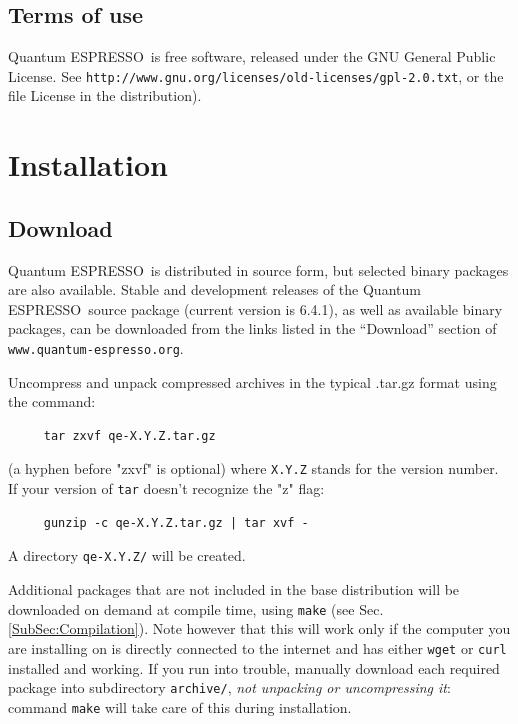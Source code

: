 \documentclass[12pt,a4paper]{article}
\def\version{6.4}
\def\version{6.4.1}
\def\qe{{\sc Quantum ESPRESSO}}
\begin{document}
\subsection{Terms of use}
\label{SubSec:Terms}

\qe\ is free software, released under the
GNU General Public License. See
\texttt{http://www.gnu.org/licenses/old-licenses/gpl-2.0.txt},
or the file License in the distribution).


\section{Installation}

\subsection{Download}
\label{SubSec:Download}

\qe\ is distributed in source form, but selected binary packages
are also available.
Stable and development releases of the \qe\ source package
(current version is \version), as well as available binary
packages, can be downloaded from the links listed in the
``Download'' section of \texttt{www.quantum-espresso.org}.

Uncompress and unpack compressed archives in the typical .tar.gz
format using the command:
\begin{verbatim}
     tar zxvf qe-X.Y.Z.tar.gz
\end{verbatim}
(a hyphen before "zxvf" is optional) where \texttt{X.Y.Z} stands for the
version number. If your version of \texttt{tar}
doesn't recognize the "z" flag:
\begin{verbatim}
     gunzip -c qe-X.Y.Z.tar.gz | tar xvf -
\end{verbatim}
A directory \texttt{qe-X.Y.Z/} will be created.

Additional packages that are not included in the base distribution
will be downloaded on demand at compile time, using \texttt{make}
(see Sec.\ref{SubSec:Compilation}).
Note however that this will work only if the computer you are
installing on is directly connected to the internet and has
either \texttt{wget} or \texttt{curl} installed and working.
If you run into trouble, manually download each required package
into subdirectory \texttt{archive/}, {\em not unpacking or
uncompressing it}:
command \texttt{make} will take care of this during installation.
\end{document}
